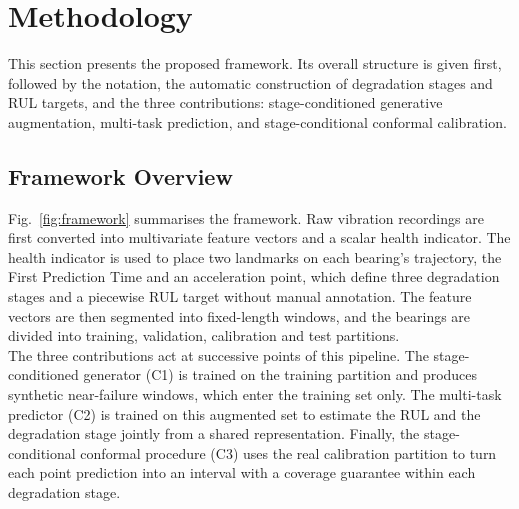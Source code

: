 %
%

\section{Methodology}
\label{sec:methodology}

This section presents the proposed framework. Its overall structure
is given first, followed by the notation, the automatic construction
of degradation stages and RUL targets, and the three contributions:
stage-conditioned generative augmentation, multi-task prediction, and
stage-conditional conformal calibration.

\subsection{Framework Overview}
\label{sec:method_overview}

Fig.~\ref{fig:framework} summarises the framework. Raw vibration
recordings are first converted into multivariate feature vectors and
a scalar health indicator. The health indicator is used to place two
landmarks on each bearing's trajectory, the First Prediction Time and
an acceleration point, which define three degradation stages and a
piecewise RUL target without manual annotation. The feature vectors
are then segmented into fixed-length windows, and the bearings are
divided into training, validation, calibration and test partitions.\\

The three contributions act at successive points of this pipeline.
The stage-conditioned generator (C1) is trained on the training
partition and produces synthetic near-failure windows, which enter
the training set only. The multi-task predictor (C2) is trained on
this augmented set to estimate the RUL and the degradation stage
jointly from a shared representation. Finally, the stage-conditional
conformal procedure (C3) uses the real calibration partition to turn
each point prediction into an interval with a coverage guarantee
within each degradation stage.\\

